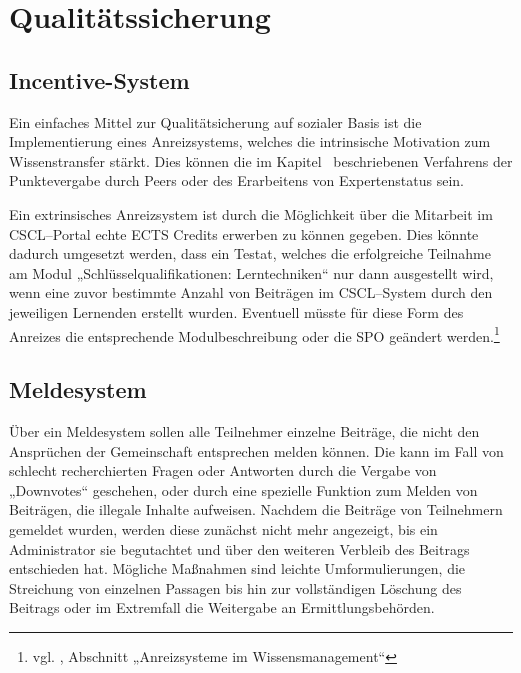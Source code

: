 
\section{Qualitätssicherung} %
\label{sec:qualitatssicherung}

\subsection{Incentive-System} %
\label{sub:incentive_system}
Ein einfaches Mittel zur Qualitätsicherung auf sozialer Basis ist die Implementierung eines Anreizsystems, welches die intrinsische Motivation zum Wissenstransfer stärkt. Dies können die im Kapitel~ beschriebenen Verfahrens der Punktevergabe durch Peers oder des Erarbeitens von Expertenstatus sein.

Ein extrinsisches Anreizsystem ist durch die Möglichkeit über die Mitarbeit im \ac{CSCL}–Portal echte \ac{ECTS} Credits erwerben zu können gegeben. Dies könnte dadurch umgesetzt werden, dass ein Testat, welches die erfolgreiche Teilnahme am Modul „Schlüsselqualifikationen: Lerntechniken“ nur dann ausgestellt wird, wenn eine zuvor bestimmte Anzahl von Beiträgen im \ac{CSCL}–System durch den jeweiligen Lernenden erstellt wurden. Eventuell müsste für diese Form des Anreizes die entsprechende Modulbeschreibung oder die \ac{SPO} geändert werden.\footnote{vgl. \cite{beuth:anreiz}, Abschnitt „Anreizsysteme im Wissensmanagement“}

\subsection{Meldesystem} %
\label{sub:meldesystem}
Über ein Meldesystem sollen alle Teilnehmer einzelne Beiträge, die nicht den Ansprüchen der Gemeinschaft entsprechen melden können. Die kann im Fall von schlecht recherchierten Fragen oder Antworten durch die Vergabe von „Downvotes“ geschehen, oder durch eine spezielle Funktion zum Melden von Beiträgen, die illegale Inhalte aufweisen. Nachdem die Beiträge von Teilnehmern gemeldet wurden, werden diese zunächst nicht mehr angezeigt, bis ein Administrator sie begutachtet und über den weiteren Verbleib des Beitrags entschieden hat. Mögliche Maßnahmen sind leichte Umformulierungen, die Streichung von einzelnen Passagen bis hin zur vollständigen Löschung des Beitrags oder im Extremfall die Weitergabe an Ermittlungsbehörden.


